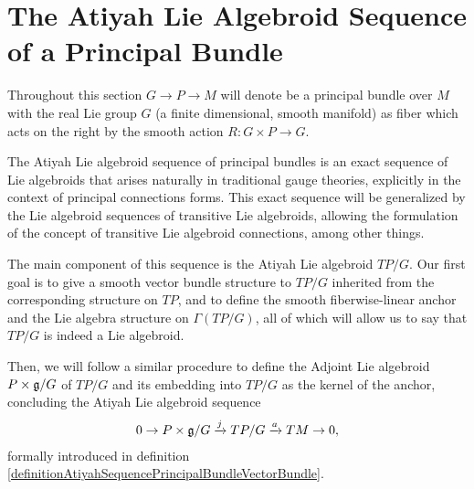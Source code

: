 





\section{The Atiyah Lie Algebroid Sequence of a Principal Bundle}

Throughout this section $G \to P \to M$ will denote be a principal bundle over $M$ with the real Lie group $G$ (a finite dimensional, smooth manifold) as fiber which acts on the right by the smooth action $R: G \times P \to G$.

The Atiyah Lie algebroid sequence of principal bundles is an exact sequence of Lie algebroids that arises naturally in traditional gauge theories, explicitly in the context of principal connections forms. This exact sequence will be generalized by the Lie algebroid sequences of transitive Lie algebroids, allowing the formulation of the concept of transitive Lie algebroid connections, among other things.

The main component of this sequence is the Atiyah Lie algebroid $TP/G$. Our first goal is to give a smooth vector bundle structure to $TP/G$ inherited from the corresponding structure on $TP$, and to define the smooth fiberwise-linear anchor and the Lie algebra structure on $\Gamma(TP/G)$, all of which will allow us to say that $TP/G$ is indeed a Lie algebroid.

Then, we will follow a similar procedure to define the Adjoint Lie algebroid $P \times \mathfrak{g}/G$ of $TP/G$ and its embedding into $TP/G$ as the kernel of the anchor, concluding the Atiyah Lie algebroid sequence
\begin{align*}
    0 \to P \times \mathfrak{g}/G \xrightarrow{j} TP/G \xrightarrow{a} TM \to 0,
\end{align*}
formally introduced in definition \ref{definitionAtiyahSequencePrincipalBundleVectorBundle}.

